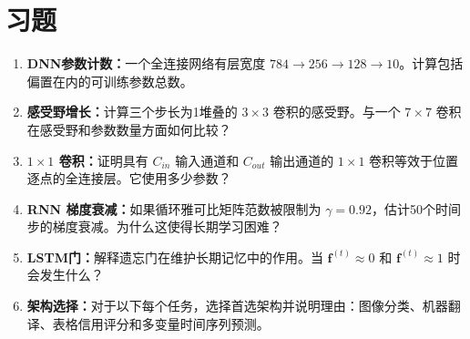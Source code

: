 \section{习题}

\begin{enumerate}
    \item \textbf{DNN参数计数：}一个全连接网络有层宽度 $784 \rightarrow 256 \rightarrow 128 \rightarrow 10$。计算包括偏置在内的可训练参数总数。

    \item \textbf{感受野增长：}计算三个步长为1堆叠的 $3\times3$ 卷积的感受野。与一个 $7\times7$ 卷积在感受野和参数数量方面如何比较？

    \item \textbf{$1\times1$ 卷积：}证明具有 $C_{in}$ 输入通道和 $C_{out}$ 输出通道的 $1\times1$ 卷积等效于位置逐点的全连接层。它使用多少参数？

    \item \textbf{RNN 梯度衰减：}如果循环雅可比矩阵范数被限制为 $\gamma = 0.92$，估计50个时间步的梯度衰减。为什么这使得长期学习困难？

    \item \textbf{LSTM门：}解释遗忘门在维护长期记忆中的作用。当 $\mathbf{f}^{(t)} \approx 0$ 和 $\mathbf{f}^{(t)} \approx 1$ 时会发生什么？

    \item \textbf{架构选择：}对于以下每个任务，选择首选架构并说明理由：图像分类、机器翻译、表格信用评分和多变量时间序列预测。
\end{enumerate}
